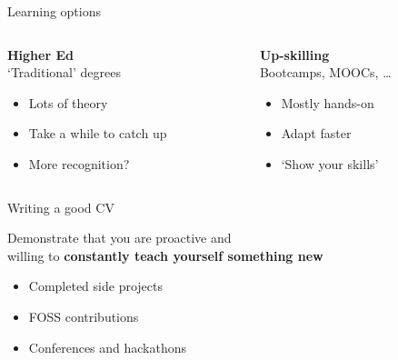 \begin{frame}{Learning options}
    \begin{columns}
        \begin{column}{0.5\textwidth}
            \centering%
            {\large\bf%
             Higher Ed} \\[\medskipamount]
            `Traditional' degrees \\[\bigskipamount]
            \begin{itemize}
                \setlength{\itemsep}{\medskipamount}
                \item Lots of theory
                \item Take a while to catch up
                \item More recognition?
            \end{itemize}
        \end{column}
        \begin{column}{0.5\textwidth}
            \centering%
            {\large\bf%
             Up\hyp{}skilling} \\[\medskipamount]
            Bootcamps, MOOCs, \ldots \\[\bigskipamount]
            \begin{itemize}
                \setlength{\itemsep}{\medskipamount}
                \item Mostly hands\hyp{}on
                \item Adapt faster
                \item `Show your skills'
            \end{itemize}
        \end{column}
    \end{columns}
\end{frame}

\begin{frame}{Writing a good CV}
    \begin{center}
        \large%
        Demonstrate that you are proactive and \\
        willing to \textbf{constantly teach yourself something new}
    \end{center}
    \vfill
    \begin{itemize}
        \item Completed side projects
        \item FOSS contributions
        \item Conferences and hackathons
    \end{itemize}
\end{frame}

